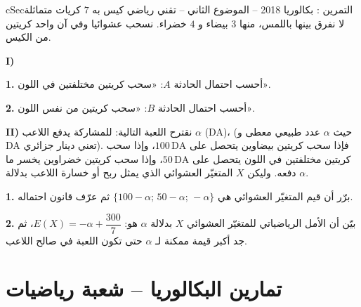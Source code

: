 \documentclass[12pt,a4paper]{article}
\newenvironment{BOX}[2]{\begin{otherlanguage}{english}\begin{arbox}{#1}{#2}}{\end{arbox}\end{otherlanguage}}
\newcounter{exo}
\newenvironment{tamrin}[1]{\stepcounter{exo}\begin{BOX}{cSec}{التمرين \theexo: #1}}{\end{BOX}}
\newcommand{\QQ}[1]{\par\smallskip\textbf{#1.} }
\begin{document}
\begin{tamrin}{بكالوريا 2018 -- الموضوع الثاني -- تقني رياضي}
كيس به $7$ كريات متماثلة لا نفرق بينها باللمس، منها $3$ بيضاء و $4$ خضراء. نسحب عشوائيا وفي آن واحد كريتين من الكيس.

\textbf{I)}
\QQ{1} أحسب احتمال الحادثة $A$: «سحب كريتين مختلفتين في اللون».
\QQ{2} أحسب احتمال الحادثة $B$: «سحب كريتين من نفس اللون».

\textbf{II)} نقترح اللعبة التالية: للمشاركة يدفع اللاعب $\alpha$ (DA)، (حيث $\alpha$ عدد طبيعي معطى و DA تعني دينار جزائري).
فإذا سحب كريتين بيضاوين يتحصل على $100\,\text{DA}$، وإذا سحب كريتين مختلفتين في اللون يتحصل على $50\,\text{DA}$، وإذا سحب كريتين خضراوين يخسر ما دفعه. وليكن $X$ المتغيّر العشوائي الذي يمثل ربح أو خسارة اللاعب بدلالة $\alpha$.
\QQ{1} برّر أن قيم المتغيّر العشوائي هي $\{100-\alpha;\,50-\alpha;\,-\alpha\}$ ثم عرّف قانون احتماله.
\QQ{2} بيّن أن الأمل الرياضياتي للمتغيّر العشوائي $X$ بدلالة $\alpha$ هو: $E(X)=-\alpha+\dfrac{300}{7}$، ثم جد أكبر قيمة ممكنة لـ $\alpha$ حتى تكون اللعبة في صالح اللاعب.
\end{tamrin}

\section{تمارين البكالوريا -- شعبة رياضيات}
\end{document}
